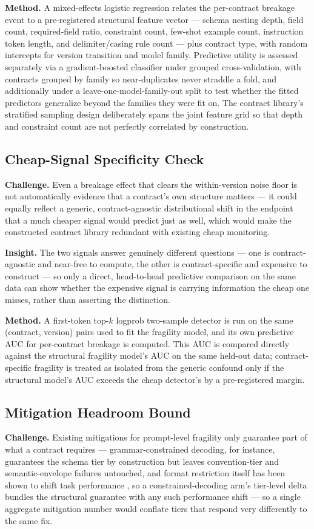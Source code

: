 \documentclass[11pt]{article}
\begin{document}
\textbf{Method.} A mixed-effects logistic regression relates the per-contract breakage event to a pre-registered structural feature vector --- schema nesting depth, field count, required-field ratio, constraint count, few-shot example count, instruction token length, and delimiter/casing rule count --- plus contract type, with random intercepts for version transition and model family. Predictive utility is assessed separately via a gradient-boosted classifier under grouped cross-validation, with contracts grouped by family so near-duplicates never straddle a fold, and additionally under a leave-one-model-family-out split to test whether the fitted predictors generalize beyond the families they were fit on. The contract library's stratified sampling design deliberately spans the joint feature grid so that depth and constraint count are not perfectly correlated by construction.

\subsection{Cheap-Signal Specificity Check}
\textbf{Challenge.} Even a breakage effect that clears the within-version noise floor is not automatically evidence that a contract's own structure matters --- it could equally reflect a generic, contract-agnostic distributional shift in the endpoint that a much cheaper signal would predict just as well, which would make the constructed contract library redundant with existing cheap monitoring.

\textbf{Insight.} The two signals answer genuinely different questions --- one is contract-agnostic and near-free to compute, the other is contract-specific and expensive to construct --- so only a direct, head-to-head predictive comparison on the same data can show whether the expensive signal is carrying information the cheap one misses, rather than asserting the distinction.

\textbf{Method.} A first-token top-$k$ logprob two-sample detector is run on the same (contract, version) pairs used to fit the fragility model, and its own predictive AUC for per-contract breakage is computed. This AUC is compared directly against the structural fragility model's AUC on the same held-out data; contract-specific fragility is treated as isolated from the generic confound only if the structural model's AUC exceeds the cheap detector's by a pre-registered margin.

\subsection{Mitigation Headroom Bound}
\textbf{Challenge.} Existing mitigations for prompt-level fragility only guarantee part of what a contract requires --- grammar-constrained decoding, for instance, guarantees the schema tier by construction but leaves convention-tier and semantic-envelope failures untouched, and format restriction itself has been shown to shift task performance \citep{Tam2024LetMeSpeak}, so a constrained-decoding arm's tier-level delta bundles the structural guarantee with any such performance shift --- so a single aggregate mitigation number would conflate tiers that respond very differently to the same fix.
\end{document}
